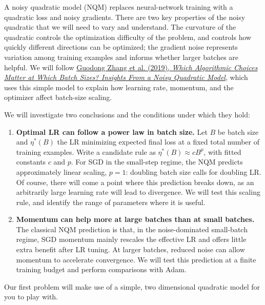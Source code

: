 
A noisy quadratic model (NQM) replaces neural-network training with a quadratic
loss and noisy gradients. There are two key properties of the noisy quadratic that we will need to vary and understand. The curvature of the quadratic controls the optimization difficulty of the problem, and controls how quickly different directions
can be optimized; the gradient noise represents variation among training examples and informs whether larger batches are helpful.
We will follow
\href{https://proceedings.neurips.cc/paper_files/paper/2019/hash/e0eacd983971634327ae1819ea8b6214-Abstract.html}{Guodong Zhang et al. (2019),
\emph{Which Algorithmic Choices Matter at Which Batch Sizes? Insights From a
Noisy Quadratic Model}}, which uses this simple model to explain how learning
rate, momentum, and the optimizer affect batch-size scaling.

We will investigate two conclusions and the conditions under which they hold:
\begin{enumerate}[label=\arabic*.]
\item \textbf{Optimal LR can follow a power law in batch size.}
Let $B$ be batch size and $\eta^*(B)$ the LR minimizing expected final loss
at a fixed total number of training examples. Write a candidate rule as
$\eta^*(B)\approx cB^p$, with fitted constants $c$ and $p$.
For SGD in the small-step regime, the NQM predicts approximately linear scaling,
        $p=1$: doubling batch size calls for doubling LR. Of course, there will come a point where this prediction breaks down, as an arbitrarily large learning rate will lead to divergence. We will test this scaling rule, and identify the range of parameters where it is useful.
\item \textbf{Momentum can help more at large batches than at small batches.}
The classical NQM prediction is that, in the noise-dominated small-batch regime,
SGD momentum mainly rescales the effective LR and offers little extra benefit
after LR tuning. At larger batches, reduced noise can allow momentum to
accelerate convergence. We will test this prediction at a finite training budget and perform comparisons with Adam.
\end{enumerate}


Our first problem will make use of a simple, two dimensional quadratic model for you to play with.
